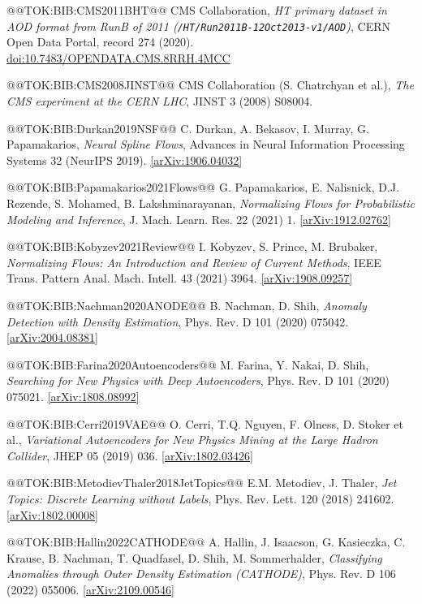 \documentclass{article}
\begin{document}
@@TOK:BIB:CMS2011BHT@@ CMS Collaboration,
\emph{HT primary dataset in AOD format from RunB of 2011 (\texttt{/HT/Run2011B-12Oct2013-v1/AOD})},
CERN Open Data Portal, record 274 (2020). \href{https://doi.org/10.7483/OPENDATA.CMS.8RRH.4MCC}{doi:10.7483/OPENDATA.CMS.8RRH.4MCC}

@@TOK:BIB:CMS2008JINST@@ CMS Collaboration (S. Chatrchyan et al.),
\emph{The CMS experiment at the CERN LHC},
JINST 3 (2008) S08004.

@@TOK:BIB:Durkan2019NSF@@ C. Durkan, A. Bekasov, I. Murray, G. Papamakarios,
\emph{Neural Spline Flows},
Advances in Neural Information Processing Systems 32 (NeurIPS 2019). \href{https://arxiv.org/abs/1906.04032}{[arXiv:1906.04032]}

@@TOK:BIB:Papamakarios2021Flows@@ G. Papamakarios, E. Nalisnick, D.J. Rezende, S. Mohamed, B. Lakshminarayanan,
\emph{Normalizing Flows for Probabilistic Modeling and Inference},
J. Mach. Learn. Res. 22 (2021) 1. \href{https://arxiv.org/abs/1912.02762}{[arXiv:1912.02762]}

@@TOK:BIB:Kobyzev2021Review@@ I. Kobyzev, S. Prince, M. Brubaker,
\emph{Normalizing Flows: An Introduction and Review of Current Methods},
IEEE Trans. Pattern Anal. Mach. Intell. 43 (2021) 3964. \href{https://arxiv.org/abs/1908.09257}{[arXiv:1908.09257]}

@@TOK:BIB:Nachman2020ANODE@@ B. Nachman, D. Shih,
\emph{Anomaly Detection with Density Estimation},
Phys. Rev. D 101 (2020) 075042. \href{https://arxiv.org/abs/2004.08381}{[arXiv:2004.08381]}

@@TOK:BIB:Farina2020Autoencoders@@ M. Farina, Y. Nakai, D. Shih,
\emph{Searching for New Physics with Deep Autoencoders},
Phys. Rev. D 101 (2020) 075021. \href{https://arxiv.org/abs/1808.08992}{[arXiv:1808.08992]}

@@TOK:BIB:Cerri2019VAE@@ O. Cerri, T.Q. Nguyen, F. Olness, D. Stoker et al.,
\emph{Variational Autoencoders for New Physics Mining at the Large Hadron Collider},
JHEP 05 (2019) 036. \href{https://arxiv.org/abs/1802.03426}{[arXiv:1802.03426]}

@@TOK:BIB:MetodievThaler2018JetTopics@@ E.M. Metodiev, J. Thaler,
\emph{Jet Topics: Discrete Learning without Labels},
Phys. Rev. Lett. 120 (2018) 241602. \href{https://arxiv.org/abs/1802.00008}{[arXiv:1802.00008]}

@@TOK:BIB:Hallin2022CATHODE@@ A. Hallin, J. Isaacson, G. Kasieczka, C. Krause, B. Nachman, T. Quadfasel, D. Shih, M. Sommerhalder,
\emph{Classifying Anomalies through Outer Density Estimation (CATHODE)},
Phys. Rev. D 106 (2022) 055006. \href{https://arxiv.org/abs/2109.00546}{[arXiv:2109.00546]}
\end{document}
